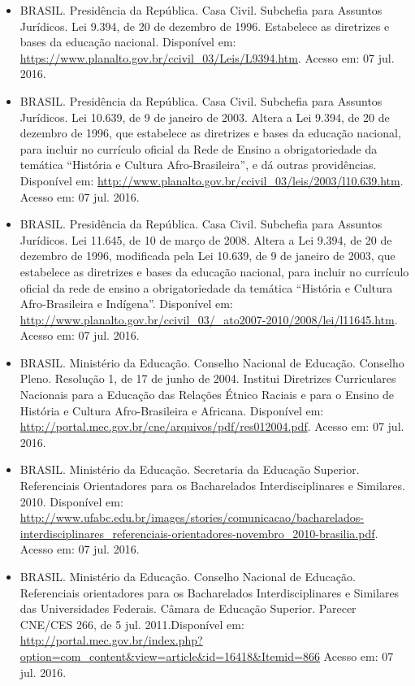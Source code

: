 \documentclass{article}
\begin{document}
\begin{itemize}

\item BRASIL. Presidência da República. Casa Civil. Subchefia para Assuntos Jurídicos. Lei 9.394, de 20 de dezembro de 1996. Estabelece as diretrizes e bases da educação nacional. Disponível em: \url{https://www.planalto.gov.br/ccivil_03/Leis/L9394.htm}. Acesso em: 07 jul. 2016.

\item BRASIL. Presidência da República. Casa Civil. Subchefia para Assuntos Jurídicos. Lei 10.639, de 9 de janeiro de 2003. Altera a Lei 9.394, de 20 de dezembro de 1996, que estabelece as diretrizes e bases da educação nacional, para incluir no currículo oficial da Rede de Ensino a obrigatoriedade da temática ``História e Cultura Afro-Brasileira'', e dá outras providências. Disponível em: \url{http://www.planalto.gov.br/ccivil_03/leis/2003/l10.639.htm}. Acesso em: 07 jul. 2016.

\item BRASIL. Presidência da República. Casa Civil. Subchefia para Assuntos Jurídicos. Lei 11.645, de 10 de março de 2008. Altera a Lei 9.394, de 20 de dezembro de 1996, modificada pela Lei 10.639, de 9 de janeiro de 2003, que estabelece as diretrizes e bases da educação nacional, para incluir no currículo oficial da rede de ensino a obrigatoriedade da temática ``História e Cultura Afro-Brasileira e Indígena''. Disponível em: \url{http://www.planalto.gov.br/ccivil_03/_ato2007-2010/2008/lei/l11645.htm}. Acesso em:
07 jul. 2016.

\item BRASIL. Ministério da Educação. Conselho Nacional de Educação. Conselho Pleno. Resolução 1, de 17 de junho de 2004. Institui Diretrizes Curriculares Nacionais para a Educação das Relações Étnico Raciais e para o Ensino de História e Cultura Afro-Brasileira e Africana. Disponível em:
\url{http://portal.mec.gov.br/cne/arquivos/pdf/res012004.pdf}. Acesso em: 07 jul. 2016.

\item BRASIL. Ministério da Educação. Secretaria da Educação Superior. Referenciais Orientadores para os Bacharelados Interdisciplinares e Similares. 2010. Disponível em: \url{http://www.ufabc.edu.br/images/stories/comunicacao/bacharelados-interdisciplinares_referenciais-orientadores-novembro_2010-brasilia.pdf}. Acesso em: 07 jul. 2016.


\item BRASIL. Ministério da Educação. Conselho Nacional de Educação. Referenciais orientadores para os Bacharelados Interdisciplinares e Similares das Universidades Federais. Câmara de Educação Superior. Parecer CNE/CES 266, de 5 jul. 2011.Disponível em: \url{http://portal.mec.gov.br/index.php?option=com_content&view=article&id=16418&Itemid=866} Acesso em: 07 jul. 2016.


\end{itemize}
\end{document}
